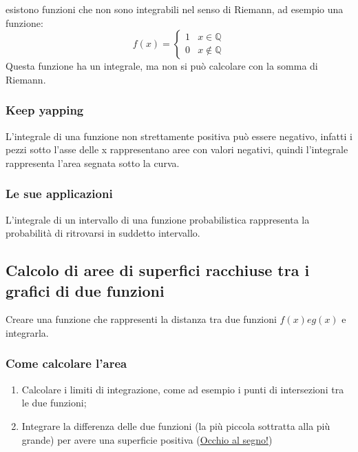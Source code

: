 \documentclass{article}
\begin{document}
{} esistono funzioni che non sono integrabili nel senso di
Riemann, ad esempio una funzione:
\[
    f(x)=
    \begin{cases}
    1 & x \in \mathbb{Q} \\
    0 & x \notin \mathbb{Q}
    \end{cases}
\]
Questa funzione ha un integrale, ma non si può calcolare con la somma di Riemann.

\subsubsection{Keep yapping}
L'integrale di una funzione non strettamente positiva può essere negativo, infatti i pezzi
sotto l'asse delle x rappresentano aree con valori negativi, quindi l'integrale rappresenta
l'area segnata sotto la curva.

\subsubsection{Le sue applicazioni}
L'integrale di un intervallo di una funzione probabilistica rappresenta la probabilità di
ritrovarsi in suddetto intervallo.

\newpage
\subsection{Calcolo di aree di superfici racchiuse tra i grafici di due funzioni}
Creare una funzione che rappresenti la distanza tra due funzioni \(f(x) e g(x)\) e integrarla.

\subsubsection{Come calcolare l'area}
\begin{enumerate}
    \item Calcolare i limiti di integrazione, come ad esempio i punti di intersezioni tra le
        due funzioni;
    \item Integrare la differenza delle due funzioni (la più piccola sottratta alla più grande)
        per avere una superficie positiva ({\color{red}\underline{Occhio al segno!}})
\end{enumerate}\phantom{}
\end{document}
